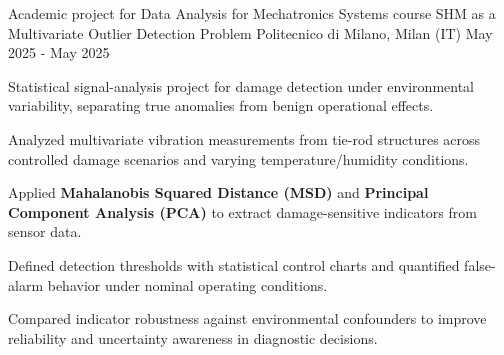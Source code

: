
\cventry
{Academic project for Data Analysis for Mechatronics Systems course}
{SHM as a Multivariate Outlier Detection Problem}
{Politecnico di Milano, Milan (IT)}
{May 2025 - May 2025}
{
    Statistical signal-analysis project for damage detection under environmental variability, separating true anomalies from benign operational effects.
    \newline
    \vspace{4mm}
    \begin{cvitems}
        \item {Analyzed multivariate vibration measurements from tie-rod structures across controlled damage scenarios and varying temperature/humidity conditions.}
        \item {Applied \textbf{Mahalanobis Squared Distance (MSD)} and \textbf{Principal Component Analysis (PCA)} to extract damage-sensitive indicators from sensor data.}
        \item {Defined detection thresholds with statistical control charts and quantified false-alarm behavior under nominal operating conditions.}
        \item {Compared indicator robustness against environmental confounders to improve reliability and uncertainty awareness in diagnostic decisions.}
    \end{cvitems}
}
